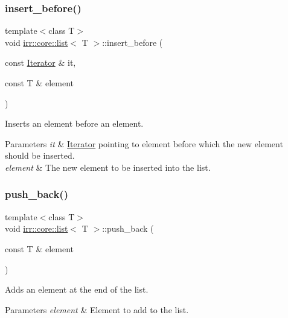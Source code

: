 \subsubsection{\texorpdfstring{insert\+\_\+before()}{insert\_before()}}
{\footnotesize\ttfamily template$<$class T$>$ \\
void \hyperlink{classirr_1_1core_1_1list}{irr\+::core\+::list}$<$ T $>$\+::insert\+\_\+before (\begin{DoxyParamCaption}\item[{const \hyperlink{classirr_1_1core_1_1list_1_1Iterator}{Iterator} \&}]{it,  }\item[{const T \&}]{element }\end{DoxyParamCaption})\hspace{0.3cm}{\ttfamily [inline]}}



Inserts an element before an element. 


\begin{DoxyParams}{Parameters}
{\em it} & \hyperlink{classirr_1_1core_1_1list_1_1Iterator}{Iterator} pointing to element before which the new element should be inserted. \\
\hline
{\em element} & The new element to be inserted into the list. \\
\hline
\end{DoxyParams}
\mbox{\label{classirr_1_1core_1_1list_a0f73ebd87279766f339cb1462c2a24d1}} 
\subsubsection{\texorpdfstring{push\+\_\+back()}{push\_back()}}
{\footnotesize\ttfamily template$<$class T$>$ \\
void \hyperlink{classirr_1_1core_1_1list}{irr\+::core\+::list}$<$ T $>$\+::push\+\_\+back (\begin{DoxyParamCaption}\item[{const T \&}]{element }\end{DoxyParamCaption})\hspace{0.3cm}{\ttfamily [inline]}}



Adds an element at the end of the list. 


\begin{DoxyParams}{Parameters}
{\em element} & Element to add to the list. \\
\hline
\end{DoxyParams}
\mbox{\label{classirr_1_1core_1_1list_aec58963596cbc0435e706d1d00777b61}} 

